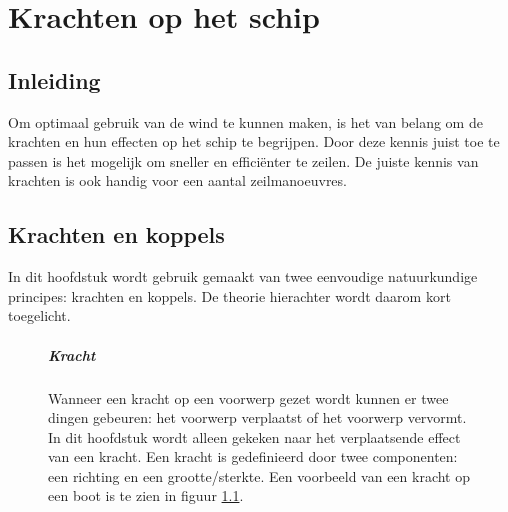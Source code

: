 \chapter{Krachten op het schip}
\section{Inleiding}

Om optimaal gebruik van de wind te kunnen maken, is het van belang om de krachten en hun effecten op het schip te begrijpen. Door deze kennis juist toe te passen is het mogelijk om sneller en efficiënter te zeilen. De juiste kennis van krachten is ook handig voor een aantal zeilmanoeuvres. 

\section{Krachten en koppels}
\label{par:krachten_uitleg}
In dit hoofdstuk wordt gebruik gemaakt van twee eenvoudige natuurkundige principes: krachten en koppels. De theorie hierachter wordt daarom kort toegelicht.

\begin{figure}[H]
	\centering
	\begin{minipage}[t]{0.75\textwidth}
		\paragraph{Kracht}
		Wanneer een kracht op een voorwerp gezet wordt kunnen er twee dingen gebeuren: het voorwerp verplaatst of het voorwerp vervormt. In dit hoofdstuk wordt alleen gekeken naar het verplaatsende effect van een kracht. Een kracht is gedefinieerd door twee componenten: een richting en een grootte/sterkte. Een voorbeeld van een kracht op een boot is te zien in figuur  \ref{pic:kracht}. 
	\end{minipage}
	\hfill
	\begin{minipage}[t]{0.22\textwidth}
		\RemoveLine
		\caption{}
		\label{pic:kracht}
	\end{minipage}
\end{figure} 

